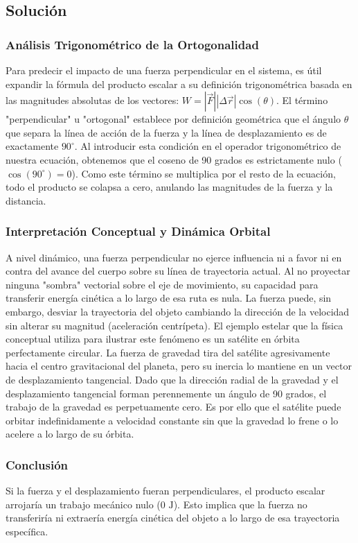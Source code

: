 \documentclass[a4paper,12pt]{article}
\begin{document}
\subsection*{Solución}

\subsubsection*{Análisis Trigonométrico de la Ortogonalidad}
Para predecir el impacto de una fuerza perpendicular en el sistema, es útil expandir la fórmula del producto escalar a su definición trigonométrica basada en las magnitudes absolutas de los vectores: $W = |\vec{F}| |\Delta\vec{r}| \cos(\theta)$. 
El término "perpendicular" u "ortogonal" establece por definición geométrica que el ángulo $\theta$ que separa la línea de acción de la fuerza y la línea de desplazamiento es de exactamente $90^\circ$. Al introducir esta condición en el operador trigonométrico de nuestra ecuación, obtenemos que el coseno de 90 grados es estrictamente nulo ($\cos(90^\circ) = 0$). Como este término se multiplica por el resto de la ecuación, todo el producto se colapsa a cero, anulando las magnitudes de la fuerza y la distancia.

\subsubsection*{Interpretación Conceptual y Dinámica Orbital}
A nivel dinámico, una fuerza perpendicular no ejerce influencia ni a favor ni en contra del avance del cuerpo sobre su línea de trayectoria actual. Al no proyectar ninguna "sombra" vectorial sobre el eje de movimiento, su capacidad para transferir energía cinética a lo largo de esa ruta es nula. La fuerza puede, sin embargo, desviar la trayectoria del objeto cambiando la dirección de la velocidad sin alterar su magnitud (aceleración centrípeta).
El ejemplo estelar que la física conceptual utiliza para ilustrar este fenómeno es un satélite en órbita perfectamente circular. La fuerza de gravedad tira del satélite agresivamente hacia el centro gravitacional del planeta, pero su inercia lo mantiene en un vector de desplazamiento tangencial. Dado que la dirección radial de la gravedad y el desplazamiento tangencial forman perennemente un ángulo de 90 grados, el trabajo de la gravedad es perpetuamente cero. Es por ello que el satélite puede orbitar indefinidamente a velocidad constante sin que la gravedad lo frene o lo acelere a lo largo de su órbita.

\subsubsection*{Conclusión}
Si la fuerza y el desplazamiento fueran perpendiculares, el producto escalar arrojaría un trabajo mecánico nulo ($0\text{ J}$). Esto implica que la fuerza no transferiría ni extraería energía cinética del objeto a lo largo de esa trayectoria específica.
\end{document}
